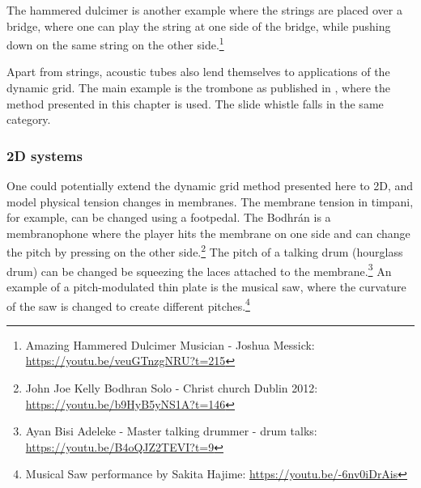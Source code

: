 The hammered dulcimer is another example where the strings are placed over a bridge, where one can play the string at one side of the bridge, while pushing down on the same string on the other side.\footnote{Amazing Hammered Dulcimer Musician - Joshua Messick: \url{https://youtu.be/veuGTnzgNRU?t=215}}

Apart from strings, acoustic tubes also lend themselves to applications of the dynamic grid. The main example is the trombone as published in \citeP[H], where the method presented in this chapter is used. The slide whistle falls in the same category. 

\subsubsection{2D systems}
One could potentially extend the dynamic grid method presented here to 2D, and model physical tension changes in membranes. The membrane tension in timpani, for example, can be changed using a footpedal. The Bodhr\'an is a membranophone where the player hits the membrane on one side and can change the pitch by pressing on the other side.\footnote{John Joe Kelly Bodhran Solo - Christ church Dublin 2012: \url{https://youtu.be/b9HyB5yNS1A?t=146}} The pitch of a talking drum (hourglass drum) can be changed be squeezing the laces attached to the membrane.\footnote{Ayan Bisi Adeleke - Master talking drummer - drum talks: \url{https://youtu.be/B4oQJZ2TEVI?t=9}} An example of a pitch-modulated thin plate is the musical saw, where the curvature of the saw is changed to create different pitches.\footnote{Musical Saw performance by Sakita Hajime: \url{https://youtu.be/-6nv0iDrAis}}







